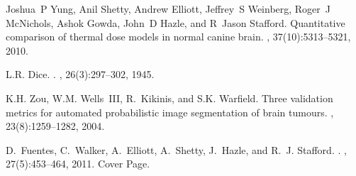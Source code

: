 \documentclass[letterpaper,12pt]{report}
\begin{document}
\begin{thebibliography}{4}

Joshua~P Yung, Anil Shetty, Andrew Elliott, Jeffrey~S Weinberg, Roger~J
  McNichols, Ashok Gowda, John~D Hazle, and R~Jason Stafford.
\newblock Quantitative comparison of thermal dose models in normal canine
  brain.
, 37(10):5313--5321, 2010.

L.R. Dice.
.
, 26(3):297--302, 1945.

K.H. Zou, W.M. Wells~III, R.~Kikinis, and S.K. Warfield.
\newblock Three validation metrics for automated probabilistic image
  segmentation of brain tumours.
, 23(8):1259--1282, 2004.

D.~Fuentes, C.~Walker, A.~Elliott, A.~Shetty, J.~Hazle, and R.~J. Stafford.
.
, 27(5):453--464, 2011.
\newblock Cover Page.

\end{thebibliography}
\end{document}
